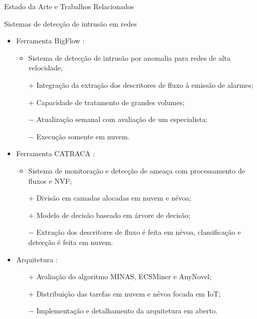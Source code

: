 \documentclass[aspectratio=1610,10pt]{beamer}
\begin{document}
\begin{frame}[fragile]{Estado da Arte e Trabalhos Relacionados}
\begin{alertblock}{Sistemas de detecção de intrusão em redes}
  \begin{itemize}%
    \item Ferramenta BigFlow \cite{Viegas2019}:
    \begin{itemize}
      \item Sistema de detecção de intrusão por anomalia para redes de alta velocidade;
      \item[$\boldsymbol{+}$] Integração da extração dos descritores de fluxo à emissão de alarmes;
      \item[$\boldsymbol{+}$] Capacidade de tratamento de grandes volumes;
      \item[$\boldsymbol{-}$] Atualização semanal com avaliação de um especialista;
      \item[$\boldsymbol{-}$] Execução somente em nuvem.
    \end{itemize}
    \item Ferramenta CATRACA \cite{Lopez2018,Sanz2018}:
    \begin{itemize}
      \item Sistema de monitoração e detecção de ameaça com processamento de fluxos e NVF;
      \item[$\boldsymbol{+}$] Divisão em camadas alocadas em nuvem e névoa;
      \item[$\boldsymbol{+}$] Modelo de decisão baseado em árvore de decisão;
      \item[$\boldsymbol{-}$] Extração dos descritores de fluxo é feita em
      névoa, classificação e detecção é feita em nuvem.
    \end{itemize}
    \item Arquitetura \arch \cite{Cassales2019a}:
    \begin{itemize}
      \item[$+$] Avaliação do algoritmo MINAS, ECSMiner e AnyNovel;
      \item[$+$] Distribuição das tarefas em nuvem e névoa focada em IoT;
      \item[$-$] Implementação e detalhamento da arquitetura em aberto.
    \end{itemize}
  \end{itemize}
\end{alertblock}
\end{frame}
\end{document}
